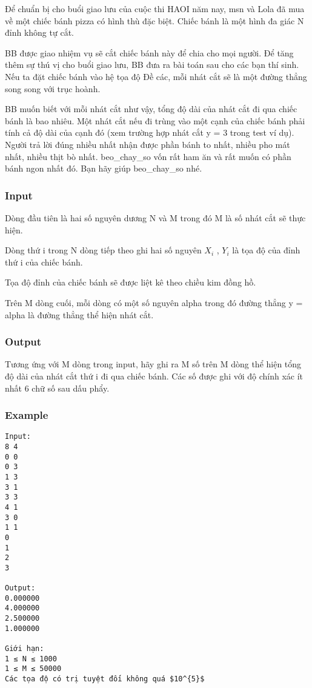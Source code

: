 



   Để chuẩn bị cho buổi giao lưu của cuộc thi HAOI năm nay, msn và Lola đã mua về một chiếc bánh pizza có hình thù đặc biệt. Chiếc bánh là một hình đa giác N đỉnh không tự cắt.  

   BB được giao nhiệm vụ sẽ cắt chiếc bánh này để chia cho mọi người. Để tăng thêm sự thú vị cho buổi giao lưu, BB đưa ra bài toán sau cho các bạn thí sinh. Nếu ta đặt chiếc bánh vào hệ tọa độ Đề các, mỗi nhát cắt sẽ là một đường thẳng song song với trục hoành.  

   BB muốn biết với mỗi nhát cắt như vậy, tổng độ dài của nhát cắt đi qua chiếc bánh là bao nhiêu. Một nhát cắt nếu đi trùng vào một cạnh của chiếc bánh phải tính cả độ dài của cạnh đó (xem trường hợp nhát cắt y = 3 trong test ví dụ). Người trả lời đúng nhiều nhất nhận được phần bánh to nhất, nhiều pho mát nhất, nhiều thịt bò nhất. beo\_chay\_so vốn rất ham ăn và rất muốn có phần bánh ngon nhất đó. Bạn hãy giúp beo\_chay\_so nhé.  

\subsubsection{   Input  }

   Dòng đầu tiên là hai số nguyên dương N và M trong đó M là số nhát cắt sẽ thực hiện.  

   Dòng thứ i trong N dòng tiếp theo ghi hai số nguyên $X_{i}$   , $Y_{i}$   là tọa độ của đỉnh thứ i của chiếc bánh.  

   Tọa độ đỉnh của chiếc bánh sẽ được liệt kê theo chiều kim đồng hồ.  

   Trên M dòng cuối, mỗi dòng có một số nguyên alpha trong đó đường thẳng y = alpha là đường thẳng thể hiện nhát cắt.  

\subsubsection{   Output  }

   Tương ứng với M dòng trong input, hãy ghi ra M số trên M dòng thể hiện tổng độ dài của nhát cắt thứ i đi qua chiếc bánh. Các số được ghi với độ chính xác ít nhất 6 chữ số sau dấu phẩy.  

\subsubsection{   Example  }
\begin{verbatim}
Input:
8 4
0 0
0 3
1 3
3 1
3 3
4 1
3 0
1 1
0
1
2
3

Output:
0.000000
4.000000
2.500000
1.000000

Giới hạn:
1 ≤ N ≤ 1000 
1 ≤ M ≤ 50000
Các tọa độ có trị tuyệt đối không quá $10^{5}$\end{verbatim}
